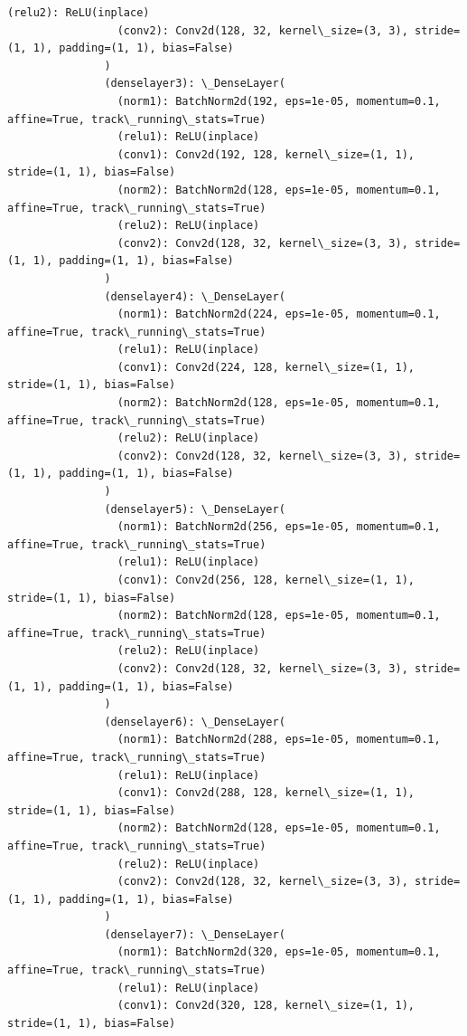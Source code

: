\documentclass[11pt]{article}
\begin{document}
\begin{Verbatim}[commandchars=\\\{\}]
                 (relu2): ReLU(inplace)
                 (conv2): Conv2d(128, 32, kernel\_size=(3, 3), stride=(1, 1), padding=(1, 1), bias=False)
               )
               (denselayer3): \_DenseLayer(
                 (norm1): BatchNorm2d(192, eps=1e-05, momentum=0.1, affine=True, track\_running\_stats=True)
                 (relu1): ReLU(inplace)
                 (conv1): Conv2d(192, 128, kernel\_size=(1, 1), stride=(1, 1), bias=False)
                 (norm2): BatchNorm2d(128, eps=1e-05, momentum=0.1, affine=True, track\_running\_stats=True)
                 (relu2): ReLU(inplace)
                 (conv2): Conv2d(128, 32, kernel\_size=(3, 3), stride=(1, 1), padding=(1, 1), bias=False)
               )
               (denselayer4): \_DenseLayer(
                 (norm1): BatchNorm2d(224, eps=1e-05, momentum=0.1, affine=True, track\_running\_stats=True)
                 (relu1): ReLU(inplace)
                 (conv1): Conv2d(224, 128, kernel\_size=(1, 1), stride=(1, 1), bias=False)
                 (norm2): BatchNorm2d(128, eps=1e-05, momentum=0.1, affine=True, track\_running\_stats=True)
                 (relu2): ReLU(inplace)
                 (conv2): Conv2d(128, 32, kernel\_size=(3, 3), stride=(1, 1), padding=(1, 1), bias=False)
               )
               (denselayer5): \_DenseLayer(
                 (norm1): BatchNorm2d(256, eps=1e-05, momentum=0.1, affine=True, track\_running\_stats=True)
                 (relu1): ReLU(inplace)
                 (conv1): Conv2d(256, 128, kernel\_size=(1, 1), stride=(1, 1), bias=False)
                 (norm2): BatchNorm2d(128, eps=1e-05, momentum=0.1, affine=True, track\_running\_stats=True)
                 (relu2): ReLU(inplace)
                 (conv2): Conv2d(128, 32, kernel\_size=(3, 3), stride=(1, 1), padding=(1, 1), bias=False)
               )
               (denselayer6): \_DenseLayer(
                 (norm1): BatchNorm2d(288, eps=1e-05, momentum=0.1, affine=True, track\_running\_stats=True)
                 (relu1): ReLU(inplace)
                 (conv1): Conv2d(288, 128, kernel\_size=(1, 1), stride=(1, 1), bias=False)
                 (norm2): BatchNorm2d(128, eps=1e-05, momentum=0.1, affine=True, track\_running\_stats=True)
                 (relu2): ReLU(inplace)
                 (conv2): Conv2d(128, 32, kernel\_size=(3, 3), stride=(1, 1), padding=(1, 1), bias=False)
               )
               (denselayer7): \_DenseLayer(
                 (norm1): BatchNorm2d(320, eps=1e-05, momentum=0.1, affine=True, track\_running\_stats=True)
                 (relu1): ReLU(inplace)
                 (conv1): Conv2d(320, 128, kernel\_size=(1, 1), stride=(1, 1), bias=False)

\end{Verbatim}
\end{document}
